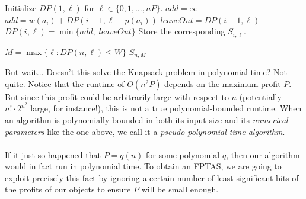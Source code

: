 \documentclass{article}
\begin{document}


\begin{algorithm}
    \renewcommand{\thealgorithm}{}
    \caption{\textsc{Knapsack-DP}$(A, w, p, W, P)$}
    \begin{algorithmic}[1]
        \State Initialize $DP(1,\ell)$ for $\ell \in \{0,1,\dots,nP\}$.
        \vspace{1ex}
                \State $add = \infty$
                    \State $add = w(a_i) + DP(i-1,\ell - p(a_i))$
                \EndIf
                \State $leaveOut = DP(i-1,\ell)$
                \State $DP(i,\ell) = \min\{add,\; leaveOut\}$
                \State Store the corresponding $S_{i,\ell}$.

            \EndFor
        \EndFor
        \vspace{1ex}
        \State $M = \max \{\ell : DP(n,\ell) \leq W\}$
        \State \Return $S_{n,M}$
    \end{algorithmic}
\end{algorithm}

\noindent But wait... Doesn't this solve the Knapsack problem in polynomial time? Not quite. Notice that the runtime of $O(n^2P)$ depends on the maximum profit $P$.  But since this profit could be arbitrarily large with respect to $n$ (potentially $\displaystyle n! \cdot 2^{n^2}$ large, for instance!), this is not a true polynomial-bounded runtime. When an algorithm is polynomially bounded in both its input size and its \textit{numerical parameters} like the one above, we call it a \textit{pseudo-polynomial time algorithm}.\\
\\
If it just so happened that $P = q(n)$ for some polynomial $q$, then our algorithm would in fact run in polynomial time. To obtain an FPTAS, we are going to exploit precisely this fact by ignoring a certain number of least significant bits of the profits of our objects to ensure $P$ will be small enough.
\end{document}
